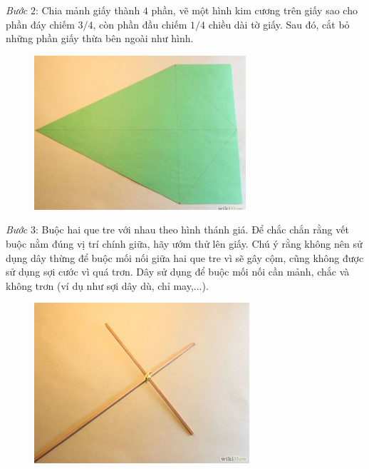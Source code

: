 \begin{multicols}{2}
\begin{figure}[H]
		\vspace*{-10pt}
	\end{figure}
	\textit{Bước} $2$: Chia mảnh giấy thành $4$ phần, vẽ một hình kim cương trên giấy sao cho phần đáy chiếm $3/4$, còn phần đầu chiếm $1/4$ chiều dài tờ giấy. Sau đó, cắt bỏ những phần giấy thừa bên ngoài như hình.
	\begin{figure}[H]
		\vspace*{-5pt}
		\centering
		\captionsetup{labelformat= empty, justification=centering}
		\includegraphics[width= 1\linewidth]{3}
		\vspace*{-10pt}
	\end{figure}
	\textit{Bước} $3$: Buộc hai que tre với nhau theo hình thánh giá. Để chắc chắn rằng vết buộc nằm đúng vị trí chính giữa, hãy ướm thử lên giấy. Chú ý rằng không nên sử dụng dây thừng để buộc mối nối giữa hai que tre vì sẽ gây cộm, cũng không được sử dụng sợi cước vì quá trơn. Dây sử dụng để buộc mối nối cần mảnh, chắc và không trơn (ví dụ như sợi dây dù, chỉ may,...).
	\begin{figure}[H]
		\vspace*{-5pt}
		\centering
		\captionsetup{labelformat= empty, justification=centering}
		\includegraphics[width= 1\linewidth]{4}

\end{figure}
\end{multicols}
